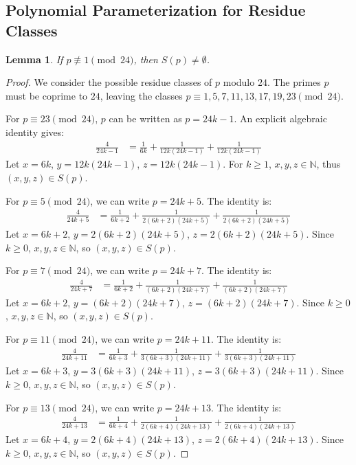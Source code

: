 \documentclass[12pt,a4paper]{article}
\newtheorem{lemma}[theorem]{Lemma}
\begin{document}
\subsection{Polynomial Parameterization for Residue Classes}
\begin{lemma} \label{lem:res_class}
If $p \not\equiv 1 \pmod{24}$, then $S(p) \neq \emptyset$.
\end{lemma}
\begin{proof}
We consider the possible residue classes of $p$ modulo $24$. The primes $p$ must be coprime to $24$, leaving the classes $p \equiv 1, 5, 7, 11, 13, 17, 19, 23 \pmod{24}$.

For $p \equiv 23 \pmod{24}$, $p$ can be written as $p = 24k - 1$. An explicit algebraic identity gives:
\begin{align}
\frac{4}{24k-1} &= \frac{1}{6k} + \frac{1}{12k(24k-1)} + \frac{1}{12k(24k-1)}
\end{align}
Let $x = 6k$, $y = 12k(24k-1)$, $z = 12k(24k-1)$. For $k \ge 1$, $x, y, z \in \mathbb{N}$, thus $(x, y, z) \in S(p)$.

For $p \equiv 5 \pmod{24}$, we can write $p = 24k + 5$. The identity is:
\begin{align}
\frac{4}{24k+5} &= \frac{1}{6k+2} + \frac{1}{2(6k+2)(24k+5)} + \frac{1}{2(6k+2)(24k+5)}
\end{align}
Let $x = 6k+2$, $y = 2(6k+2)(24k+5)$, $z = 2(6k+2)(24k+5)$. Since $k \ge 0$, $x,y,z \in \mathbb{N}$, so $(x,y,z) \in S(p)$.

For $p \equiv 7 \pmod{24}$, we can write $p = 24k + 7$. The identity is:
\begin{align}
\frac{4}{24k+7} &= \frac{1}{6k+2} + \frac{1}{(6k+2)(24k+7)} + \frac{1}{(6k+2)(24k+7)}
\end{align}
Let $x = 6k+2$, $y = (6k+2)(24k+7)$, $z = (6k+2)(24k+7)$. Since $k \ge 0$, $x,y,z \in \mathbb{N}$, so $(x,y,z) \in S(p)$.

For $p \equiv 11 \pmod{24}$, we can write $p = 24k + 11$. The identity is:
\begin{align}
\frac{4}{24k+11} &= \frac{1}{6k+3} + \frac{1}{3(6k+3)(24k+11)} + \frac{1}{3(6k+3)(24k+11)}
\end{align}
Let $x = 6k+3$, $y = 3(6k+3)(24k+11)$, $z = 3(6k+3)(24k+11)$. Since $k \ge 0$, $x,y,z \in \mathbb{N}$, so $(x,y,z) \in S(p)$.

For $p \equiv 13 \pmod{24}$, we can write $p = 24k + 13$. The identity is:
\begin{align}
\frac{4}{24k+13} &= \frac{1}{6k+4} + \frac{1}{2(6k+4)(24k+13)} + \frac{1}{2(6k+4)(24k+13)}
\end{align}
Let $x = 6k+4$, $y = 2(6k+4)(24k+13)$, $z = 2(6k+4)(24k+13)$. Since $k \ge 0$, $x,y,z \in \mathbb{N}$, so $(x,y,z) \in S(p)$.


\end{proof}
\end{document}
